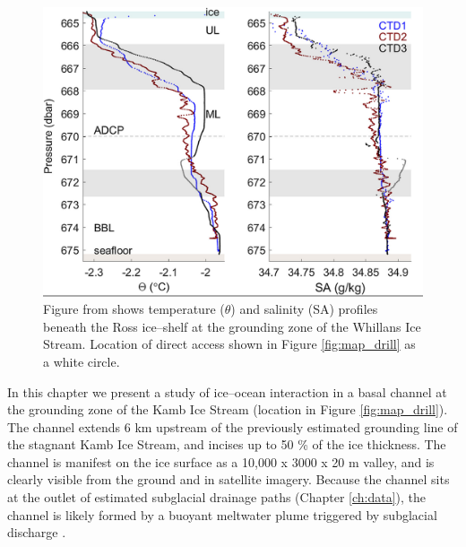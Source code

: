\begin{figure}[!ht]
\centering
    \includegraphics[width=1\textwidth]{chapters/4/oceanobs1.png}
    \caption[]{Figure from \cite{begeman2018ocean} shows temperature ($\theta$) and salinity (SA) profiles beneath the Ross ice--shelf at the grounding zone of the Whillans Ice Stream. Location of direct access shown in Figure \ref{fig:map_drill} as a white circle.}
    \label{fig:oceanobs1}
\end{figure}

In this chapter we present a study of ice--ocean interaction in a basal channel at the grounding zone of the Kamb Ice Stream (location in Figure \ref{fig:map_drill}). 
The channel extends 6 km upstream of the previously estimated grounding line of the stagnant Kamb Ice Stream, and incises up to 50 \% of the ice thickness. The channel is manifest on the ice surface as a  10,000 x 3000 x 20 m valley, and is clearly visible from the ground and in satellite imagery. Because the channel sits at the outlet of estimated subglacial drainage paths (Chapter \ref{ch:data}), the channel is likely formed by a buoyant meltwater plume triggered by subglacial discharge \citep{kim2016active, alley2016impacts}.

